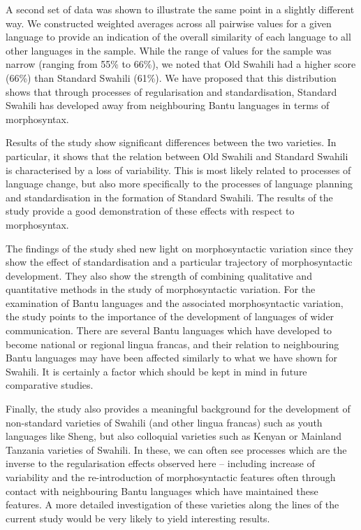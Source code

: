 \documentclass[output=paper]{langscibook}
\begin{document}
  A second set of data was shown to illustrate the same point in a slightly different way. We constructed weighted averages across all pairwise values for a given language to provide an indication of the overall similarity of each language to all other languages in the sample. While the range of values for the sample was narrow (ranging from 55\% to 66\%), we noted that Old Swahili had a higher score (66\%) than Standard Swahili (61\%). We have proposed that this distribution shows that through processes of regularisation and standardisation, Standard Swahili has developed away from neighbouring Bantu languages in terms of morphosyntax. 

  Results of the study show significant differences between the two varieties. In particular, it shows that the relation between Old Swahili and Standard Swahili is characterised by a loss of variability. This is most likely related to processes of language change, but also more specifically to the processes of language planning and standardisation in the formation of Standard Swahili. The results of the study provide a good demonstration of these effects with respect to morphosyntax. 

  The findings of the study shed new light on morphosyntactic variation since they show the effect of standardisation and a particular trajectory of morphosyntactic development. They also show the strength of combining qualitative and quantitative methods in the study of morphosyntactic variation. For the examination of Bantu languages and the associated morphosyntactic variation, the study points to the importance of the development of languages of wider communication. There are several Bantu languages which have developed to become national or regional lingua francas, and their relation to neighbouring Bantu languages may have been affected similarly to what we have shown for Swahili. It is certainly a factor which should be kept in mind in future comparative studies. 

Finally, the study also provides a meaningful background for the development of non-standard varieties of Swahili (and other lingua francas) such as youth languages like Sheng, but also colloquial varieties such as Kenyan or Mainland Tanzania varieties of Swahili. In these, we can often see processes which are the inverse to the regularisation effects observed here -- including increase of variability and the re-introduction of morphosyntactic features often through contact with neighbouring Bantu languages which have maintained these features. A more detailed investigation of these varieties along the lines of the current study would be very likely to yield interesting results. 
\end{document}
